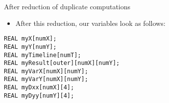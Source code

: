 \documentclass{beamer}
\begin{document}
\begin{frame}[fragile]{After reduction of duplicate computations}
    \begin{itemize}
        \item<1-> After this reduction, our variables look as follows:
    \end{itemize}

    \begin{lstlisting}
REAL myX[numX];
REAL myY[numY];
REAL myTimeline[numT];
REAL myResult[outer][numX][numY];
REAL myVarX[numX][numY];
REAL myVarY[numX][numY];
REAL myDxx[numX][4];
REAL myDyy[numY][4];
    \end{lstlisting}
\end{frame}
\end{document}
